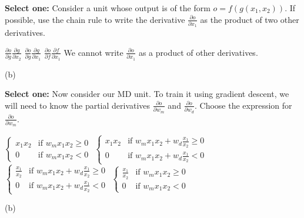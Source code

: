 \begin{questions}

\question[2] \textbf{Select one:} Consider a unit whose output is of the form $o = f(g(x_1,x_2))$. If possible, use the chain rule to write the derivative $\frac{\partial o}{\partial x_1}$ as the product of two other derivatives.
    \begin{checkboxes}
     \choice $\frac{\partial o}{\partial g}\frac{\partial g}{\partial x_2}$
     \choice $\frac{\partial o}{\partial g}\frac{\partial g}{\partial x_1}$
     \choice $\frac{\partial o}{\partial f}\frac{\partial f}{\partial x_1}$
     \choice We cannot write $\frac{\partial o}{\partial x_1}$ as a product of other derivatives.
    \end{checkboxes}
    \begin{soln}
    (b)
    \end{soln}
\vspace{1 in}


\question[2] \textbf{Select one:} Now consider our MD unit.  To train it using gradient descent, we will need to know the partial derivatives $\frac{\partial o}{\partial w_m}$ and $\frac{\partial o}{\partial w_d}$. Choose the expression for $\frac{\partial o}{\partial w_m}$.
    \begin{checkboxes}
     \choice $\begin{cases}x_1x_2 &\text{if $w_mx_1x_2 \ge 0$}\\
     0 &\text{if $w_mx_1x_2 < 0$}
     \end{cases}$
     \choice $\begin{cases}x_1x_2 &\text{if $w_mx_1x_2+w_d\frac{x_1}{x_2}\ge 0$}\\
     0 &\text{if $w_mx_1x_2+w_d\frac{x_1}{x_2}< 0$}
     \end{cases}$
     \choice$\begin{cases}\frac{x_1}{x_2} &\text{if $w_mx_1x_2+w_d\frac{x_1}{x_2}\ge 0$}\\
     0 &\text{if $w_mx_1x_2+w_d\frac{x_1}{x_2}< 0$}
     \end{cases}$
     \choice $\begin{cases}\frac{x_1}{x_2} &\text{if $w_mx_1x_2\geq 0$}\\
     0 &\text{if $w_mx_1x_2 < 0$}
     \end{cases}$
    \end{checkboxes}
    \begin{soln}
    (b)
    \end{soln}



\end{questions}
